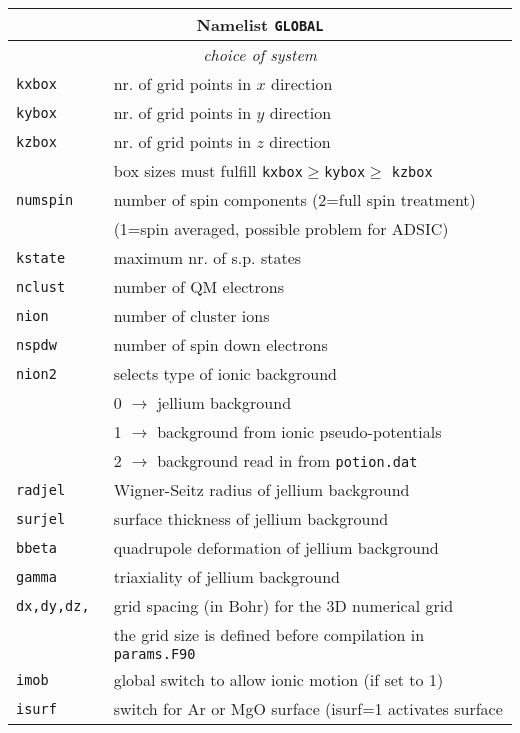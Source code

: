 \documentclass[12pt]{article}
\begin{document}
\begin{tabular}{ll}
\hline
\multicolumn{2}{c}{Namelist {\tt GLOBAL}} in {\tt for005.<name>} \\
\hline
\multicolumn{2}{c}{\it choice of system} \\
\hline
{\tt kxbox            }& nr. of grid points in $x$ direction\\
{\tt kybox            }& nr. of grid points in $y$ direction\\
{\tt kzbox            }& nr. of grid points in $z$ direction\\
& box sizes must fulfill {\tt kxbox}$\geq${\tt kybox}$\geq$ {\tt kzbox}\\
{\tt numspin}          & number of spin components (2=full spin treatment)\\
                       & (1=spin averaged, possible problem for ADSIC)\\
{\tt kstate           }& maximum nr. of s.p. states\\
{\tt nclust           }& number of QM electrons\\
{\tt nion             }& number of cluster ions\\
{\tt nspdw            }& number of spin down electrons \\
{\tt nion2            }& selects type of ionic background \\
                       &  0 $\rightarrow$ jellium background \\
                       &  1 $\rightarrow$ background from ionic pseudo-potentials\\
                       &  2 $\rightarrow$ background read in from {\tt potion.dat}\\
{\tt radjel           }& Wigner-Seitz radius of jellium background\\
{\tt surjel         }& surface thickness of jellium background\\
{\tt bbeta         }& quadrupole deformation of jellium background\\
{\tt gamma         }& triaxiality of jellium background\\
{\tt dx,dy,dz,        }& grid spacing (in  Bohr) for the 3D numerical grid\\
&the grid size is defined before compilation in {\tt params.F90}\\
{\tt imob          }& global switch to allow ionic motion (if set to 1) \\
{\tt isurf            }& switch for Ar or MgO surface (isurf=1 activates
          surface\\

\end{tabular}
\end{document}
